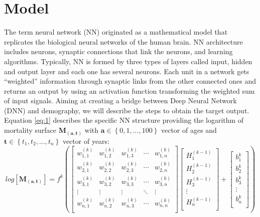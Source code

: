 \documentclass[a4,11pt]{article}
\begin{document}
\section{Model}
	The term neural network (NN) originated as a mathematical model that replicates the biological neural networks of the human brain. NN architecture includes neurons, synaptic connections that link the neurons, and learning algorithms. Typically, NN is formed by three types of layers called input, hidden and output layer and each one has several neurons. Each unit in a network gets “weighted” information through synaptic links from the other connected ones and returns an output by using an activation function transforming the weighted sum of input signals. 
Aiming at creating a bridge between Deep Neural Network (DNN) and demography, we will describe the steps to obtain the target output.
Equation \ref{eq:1} describes the specific NN structure providing the logarithm of mortality surface $\mathbf{M_{(a,t)}}$ with $\mathbf{a}\in \left\{0,1,...,100\right\}$ vector of ages and $\mathbf{t}\in \left\{t_1,t_2,...,t_n\right\}$ vector of years:
\begin{equation}
log[\mathbf{M_{(a,t)}}] =
f^{k} \left(
\begin{bmatrix}
w^{(k)}_{1,1} & w^{(k)}_{1,2} &w^{(k)}_{1,3} & \cdots & w^{(k)}_{1,n} \\
w^{(k)}_{2,1} & w^{(k)}_{2,2} &w^{(k)}_{2,3} & \cdots & w^{(k)}_{2,n} \\
w^{(k)}_{3,1} & w^{(k)}_{3,2} &w^{(k)}_{3,3} & \cdots & w^{(k)}_{3,n} \\
\vdots  & \vdots  & \vdots & \ddots & \vdots  \\
w^{(k)}_{n,1} & w^{(k)}_{n,2} &w^{(k)}_{n,3} & \cdots & w^{(k)}_{n,n} \\
\end{bmatrix}
\begin{bmatrix}
H^{(k-1)}_{1} \\
H^{(k-1)}_{2} \\
H^{(k-1)}_{3} \\
\vdots     \\
H^{(k-1)}_{n} \\
\end{bmatrix}
+
\begin{bmatrix}
b^{k}_{1}\\
b^{k}_{2} \\
b^{k}_{3} \\
\vdots     \\
b^{k}_{n} \\
\end{bmatrix}
\right)
\label{eq:1}
\end{equation}
\end{document}
